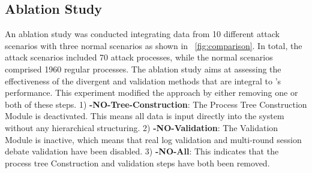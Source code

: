 \begin{table}[h!]
    \centering
    \caption{Running Time and Cost for various processes}
    \label{tab:process_metrics}
\end{table}

\subsection{Ablation Study}
\label{sec-ab-study}
An ablation study was conducted integrating data from 10 different attack scenarios with three normal scenarios as shown in ~\ref{fig:comparison}. In total, the attack scenarios included 70 attack processes, while the normal scenarios comprised 1960 regular processes.
The ablation study aims at assessing the effectiveness of the divergent and validation methods that are integral to \tool's performance. 
This experiment modified the approach by either removing one or both of these steps.
1) \textbf{\tool-NO-Tree-Construction}: The Process Tree Construction Module is deactivated. This means all data is input directly into the system without any hierarchical structuring.
2) \textbf{\tool-NO-Validation}: The Validation Module is inactive, which means that real log validation and multi-round session debate validation have been disabled.
3) \textbf{\tool-NO-All}: This indicates that the process tree Construction and validation steps have both been removed.

